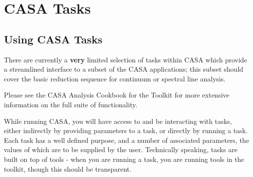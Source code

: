 

\chapter{CASA Tasks}
\label{chapter:tasks}

\section{Using CASA Tasks}
\label{section:tasks.using}

There are currently a {\bf very} limited selection of tasks within
CASA which provide a streamlined interface to a subset of the CASA
applications; this subset should cover the basic reduction sequence
for continuum or spectral line analysis.

Please see the CASA Analysis Cookbook for the Toolkit for more
extensive information on the full suite of functionality.

While running CASA, you will have access to and be interacting with
tasks, either indirectly by providing parameters to a task, or
directly by running a task.  Each task has a well defined purpose, and
a number of associated parameters, the values of which are to be
supplied by the user.  Technically speaking, tasks are built on top of
tools - when you are running a task, you are running tools in the
toolkit, though this should be transparent.

